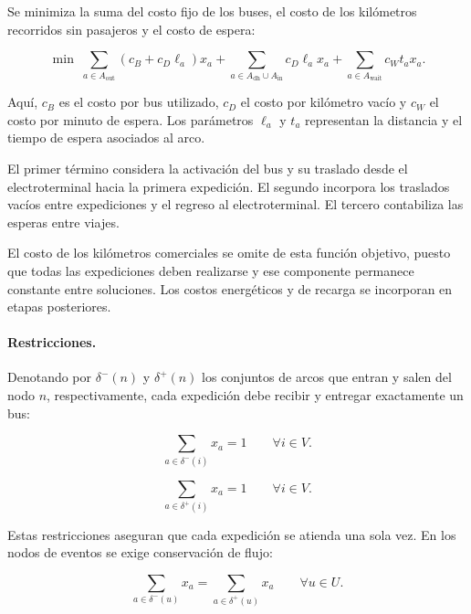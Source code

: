 Se minimiza la suma del costo fijo de los buses, el costo de los kilómetros
recorridos sin pasajeros y el costo de espera:

\begin{equation}
    \min\;
    \sum_{a \in A_{\mathrm{out}}}
    \left(c_B + c_D \ell_a\right)x_a
    +
    \sum_{a \in A_{\mathrm{dh}} \cup A_{\mathrm{in}}}
    c_D \ell_a x_a
    +
    \sum_{a \in A_{\mathrm{wait}}}
    c_W t_a x_a.
\end{equation}

Aquí, $c_B$ es el costo por bus utilizado, $c_D$ el costo por kilómetro
vacío y $c_W$ el costo por minuto de espera. Los parámetros $\ell_a$
y $t_a$ representan la distancia y el tiempo de espera asociados al arco.

El primer término considera la activación del bus y su traslado desde
el electroterminal hacia la primera expedición. El segundo incorpora
los traslados vacíos entre expediciones y el regreso al electroterminal.
El tercero contabiliza las esperas entre viajes.

El costo de los kilómetros comerciales se omite de esta función objetivo,
puesto que todas las expediciones deben realizarse y ese componente
permanece constante entre soluciones. Los costos energéticos y de recarga
se incorporan en etapas posteriores.

\paragraph{Restricciones.}

Denotando por $\delta^{-}(n)$ y $\delta^{+}(n)$ los conjuntos de arcos
que entran y salen del nodo $n$, respectivamente, cada expedición debe
recibir y entregar exactamente un bus:

\begin{equation}
    \sum_{a \in \delta^{-}(i)} x_a = 1
    \qquad \forall i \in V.
\end{equation}

\begin{equation}
    \sum_{a \in \delta^{+}(i)} x_a = 1
    \qquad \forall i \in V.
\end{equation}

Estas restricciones aseguran que cada expedición se atienda una sola vez.
En los nodos de eventos se exige conservación de flujo:

\begin{equation}
    \sum_{a \in \delta^{-}(u)} x_a
    =
    \sum_{a \in \delta^{+}(u)} x_a
    \qquad \forall u \in U.
\end{equation}

